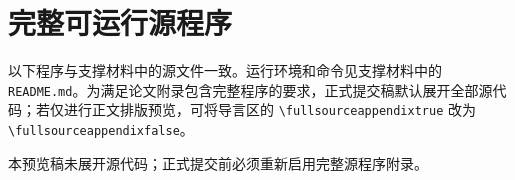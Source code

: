 \documentclass[UTF8,zihao=-4]{ctexart}
\newif\iffullsourceappendix
\begin{document}
\section{完整可运行源程序}

以下程序与支撑材料中的源文件一致。运行环境和命令见支撑材料中的
\texttt{README.md}。为满足论文附录包含完整程序的要求，正式提交稿默认展开全部源代码；若仅进行正文排版预览，可将导言区的
\verb|\fullsourceappendixtrue| 改为 \verb|\fullsourceappendixfalse|。

\iffullsourceappendix
  \subsection{统一运行入口}
  
  \subsection{问题一程序}
  
  \subsection{问题二程序}
  
  \subsection{问题三程序}
  
  \subsection{问题四程序}
  
  \subsection{问题五程序}
  
\else
  本预览稿未展开源代码；正式提交前必须重新启用完整源程序附录。
\fi
\end{document}

